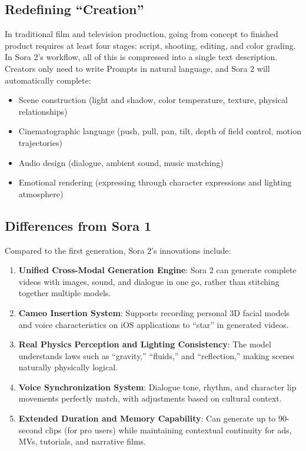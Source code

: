 \subsection{Redefining ``Creation''}

In traditional film and television production, going from concept to finished product requires at least four stages: script, shooting, editing, and color grading. In Sora 2's workflow, all of this is compressed into a single text description. Creators only need to write Prompts in natural language, and Sora 2 will automatically complete:

\begin{itemize}
\item Scene construction (light and shadow, color temperature, texture, physical relationships)
\item Cinematographic language (push, pull, pan, tilt, depth of field control, motion trajectories)
\item Audio design (dialogue, ambient sound, music matching)
\item Emotional rendering (expressing through character expressions and lighting atmosphere)
\end{itemize}

\subsection{Differences from Sora 1}

Compared to the first generation, Sora 2's innovations include:

\begin{enumerate}
\item \textbf{Unified Cross-Modal Generation Engine}: Sora 2 can generate complete videos with images, sound, and dialogue in one go, rather than stitching together multiple models.
\item \textbf{Cameo Insertion System}: Supports recording personal 3D facial models and voice characteristics on iOS applications to ``star'' in generated videos.
\item \textbf{Real Physics Perception and Lighting Consistency}: The model understands laws such as ``gravity,'' ``fluids,'' and ``reflection,'' making scenes naturally physically logical.
\item \textbf{Voice Synchronization System}: Dialogue tone, rhythm, and character lip movements perfectly match, with adjustments based on cultural context.
\item \textbf{Extended Duration and Memory Capability}: Can generate up to 90-second clips (for pro users) while maintaining contextual continuity for ads, MVs, tutorials, and narrative films.
\end{enumerate}

